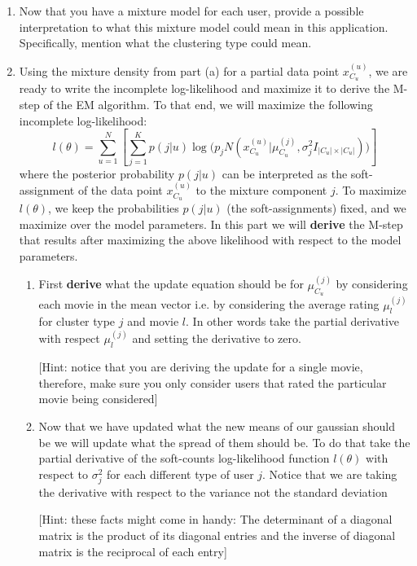 \begin{enumerate}
\begin{enumerate}
 .


 \item Now that you have a mixture model for each user, provide a possible interpretation to what this mixture model could mean in this application. Specifically, mention what the clustering type could mean.

\item Using the mixture density from part (a) for a partial data point $x^{(u)}_{C_u}$, we are ready to write the incomplete log-likelihood and maximize it to derive the M-step of the EM algorithm.
To that end, we will maximize the following incomplete log-likelihood:
$$ l(\theta) = \sum_{u=1}^N \left[ \sum^{K}_{j=1} p(j|u) \log\bigl( p_j N(x^{(u)}_{C_u} | \mu^{(j)}_{C_u}, \sigma^2_j I_{|C_u| \times |C_u|} ) \bigr) \right]$$
where the posterior probability $p(j|u)$ can be interpreted as the soft-assignment of the data point $x^{(u)}_{C_u}$ to the mixture component $j$. To maximize $l( \theta)$, we keep the probabilities $p(j|u)$ (the soft-assignments) fixed, and we maximize over the model parameters. In this part we will \textbf{derive} the M-step that results after maximizing the above likelihood with respect to the model parameters.

\begin{enumerate}
\item  First {\bf derive } what the update equation should be for $\mu^{(j)}_{C_u}$ by considering each movie in the mean vector i.e. by considering the average rating $\mu^{(j)}_{l}$ for cluster type $j$ and movie $l$. In other words take the partial derivative with respect $\mu^{(j)}_{l}$ and setting the derivative to zero.

[Hint: notice that you are deriving the update for a single movie, therefore, make sure you only consider users that rated the particular movie being considered]
\item Now that we have updated what the new means of our gaussian should be we will update what the spread of them should be.
To do that take the partial derivative of the soft-counts log-likelihood function $l(\theta)$ with respect to $ \sigma^2_{j} $ for each different type of user $j$.
Notice that we are taking the derivative with respect to the variance not the standard deviation

[Hint: these facts might come in handy: The determinant of a diagonal matrix is the product of its diagonal entries and the inverse of diagonal matrix is the reciprocal of each entry]


\end{enumerate}
\end{enumerate}
\end{enumerate}
